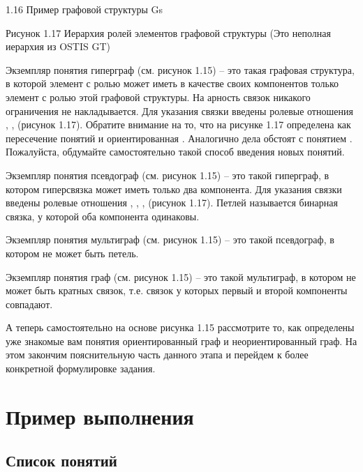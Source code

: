 1.16 Пример графовой структуры Gs
 
Рисунок 1.17 Иерархия ролей элементов графовой структуры (Это неполная иерархия из OSTIS GT)

Экземпляр понятия гиперграф (см. рисунок 1.15) – это такая графовая
структура, в которой элемент с ролью  может иметь в
качестве своих компонентов только элемент с ролью  этой
графовой структуры.  На арность связок никакого ограничения не
накладывается. Для указания связки введены ролевые отношения
, ,  (рисунок
1.17). Обратите внимание на то, что на рисунке 1.17 
определена как пересечение понятий  и
ориентированная . Аналогично дела обстоят с понятием
. Пожалуйста, обдумайте самостоятельно такой способ
введения новых понятий.

Экземпляр понятия псевдограф (см. рисунок 1.15) – это такой гиперграф,
в котором гиперсвязка может иметь только два компонента.  Для указания
связки введены ролевые отношения , ,
,  (рисунок 1.17). Петлей называется бинарная
связка, у которой оба компонента одинаковы.

Экземпляр понятия мультиграф (см. рисунок 1.15) – это такой
псевдограф, в котором не может быть петель.
 
Экземпляр понятия граф (см. рисунок 1.15) – это такой мультиграф, в
котором не может быть кратных связок, т.е. связок у которых первый и
второй компоненты совпадают.

А теперь самостоятельно на основе рисунка 1.15 рассмотрите то, как
определены уже знакомые вам понятия ориентированный граф и
неориентированный граф. На этом закончим пояснительную часть данного
этапа и перейдем к более конкретной формулировке задания.

\section{Пример выполнения}
\label{sec:-Graph_onto_example}

\subsection{Список понятий}
\label{sec:-Graph_onto_concept_list}

